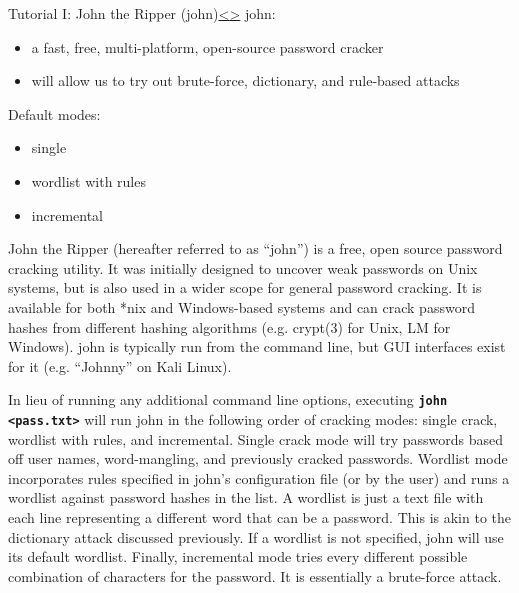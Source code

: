 \documentclass[12pt]{extarticle}
\newcommand{\code}[1]{\texttt{\bfseries#1}}
\newenvironment{instructionblock}{\Large\bgroup}{\egroup}
\newcommand{\bi}{\begin{itemize}}
\newcommand{\ei}{\end{itemize}}
\begin{document}
	\pagebreak
	\begin{slide}{Tutorial I: John the Ripper (john)}{\hyperref[slide 5]{\textless}\hyperref[slide 7]{\textgreater}}
		\begin{instructionblock}
			john:
			\bi 
			\item a fast, free, multi-platform, open-source password cracker
			\item will allow us to try out brute-force, dictionary, and rule-based attacks
			\ei 
			Default modes:
			\bi
			\item single
			\item wordlist with rules
			\item incremental
			\ei
		\end{instructionblock}
	\end{slide}
	\vfill
	
	John the Ripper (hereafter referred to as ``john'') is a free, open source password cracking utility. It was initially designed to uncover weak passwords on Unix systems, but is also used in a wider scope for general password cracking. It is available for both *nix and Windows-based systems and can crack password hashes from different hashing algorithms (e.g. crypt(3) for Unix, LM for Windows). \cite{john} john is typically run from the command line, but GUI interfaces exist for it (e.g. ``Johnny'' on Kali Linux).
	
	In lieu of running any additional command line options, executing \code{john \textless pass.txt\textgreater} will run john in the following order of cracking modes: single crack, wordlist with rules, and incremental. Single crack mode will try passwords based off user names, word-mangling, and previously cracked passwords. Wordlist mode incorporates rules specified in john's configuration file (or by the user) and runs a wordlist against password hashes in the list. A wordlist is just a text file with each line representing a different word that can be a password. This is akin to the dictionary attack discussed previously. If a wordlist is not specified, john will use its default wordlist. Finally, incremental mode tries every different possible combination of characters for the password. It is essentially a brute-force attack. \cite{john}
	
\end{document}
